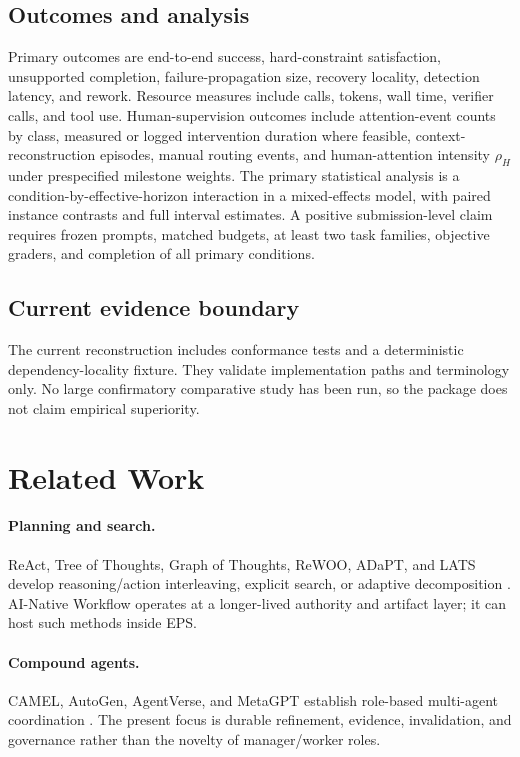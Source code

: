 \documentclass[11pt]{article}
\begin{document}
\subsection{Outcomes and analysis}
Primary outcomes are end-to-end success, hard-constraint satisfaction, unsupported completion, failure-propagation size, recovery locality, detection latency, and rework. Resource measures include calls, tokens, wall time, verifier calls, and tool use. Human-supervision outcomes include attention-event counts by class, measured or logged intervention duration where feasible, context-reconstruction episodes, manual routing events, and human-attention intensity $\rho_H$ under prespecified milestone weights. The primary statistical analysis is a condition-by-effective-horizon interaction in a mixed-effects model, with paired instance contrasts and full interval estimates. A positive submission-level claim requires frozen prompts, matched budgets, at least two task families, objective graders, and completion of all primary conditions.

\subsection{Current evidence boundary}
The current reconstruction includes conformance tests and a deterministic dependency-locality fixture. They validate implementation paths and terminology only. No large confirmatory comparative study has been run, so the package does not claim empirical superiority.

\section{Related Work}
\paragraph{Planning and search.} ReAct, Tree of Thoughts, Graph of Thoughts, ReWOO, ADaPT, and LATS develop reasoning/action interleaving, explicit search, or adaptive decomposition \citep{yao2023react,yao2023tot,besta2024got,xu2023rewoo,prasad2024adapt,zhou2024lats}. AI-Native Workflow operates at a longer-lived authority and artifact layer; it can host such methods inside EPS.

\paragraph{Compound agents.} CAMEL, AutoGen, AgentVerse, and MetaGPT establish role-based multi-agent coordination \citep{li2023camel,wu2023autogen,chen2024agentverse,hong2024metagpt}. The present focus is durable refinement, evidence, invalidation, and governance rather than the novelty of manager/worker roles.
\end{document}
